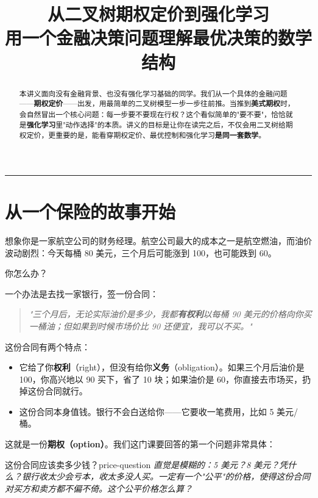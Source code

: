 \documentclass[11pt,a4paper]{ctexart}
\title{\bfseries 从二叉树期权定价到强化学习\\[4pt]
       \large 用一个金融决策问题理解最优决策的数学结构}
\author{}
\date{}
\newcommand{\1}{\mathbf{1}}
\begin{document}
\maketitle

\begin{abstract}
\noindent 本讲义面向没有金融背景、也没有强化学习基础的同学。我们从一个具体的金融问题——\textbf{期权定价}——出发，用最简单的二叉树模型一步一步往前推。当推到\textbf{美式期权}时，会自然冒出一个核心问题：每一步要不要现在行权？这个看似简单的"要不要"，恰恰就是\textbf{强化学习}里"动作选择"的本质。讲义的目标是让你在读完之后，不仅会用二叉树给期权定价，更重要的是，能看穿期权定价、最优控制和强化学习\textbf{是同一套数学}。
\end{abstract}

\tableofcontents
\vspace{1em}\hrule\vspace{1em}

\section{从一个保险的故事开始}

想象你是一家航空公司的财务经理。航空公司最大的成本之一是航空燃油，而油价波动剧烈：今天每桶 80 美元，三个月后可能涨到 100，也可能跌到 60。

你怎么办？

一个办法是去找一家银行，签一份合同：

\begin{quote}
\itshape "三个月后，无论实际油价是多少，我都\textbf{有权利}以每桶 90 美元的价格向你买一桶油；但如果到时候市场价比 90 还便宜，我可以不买。"
\end{quote}

这份合同有两个特点：

\begin{itemize}[leftmargin=*]
    \item 它给了你\textbf{权利}（right），但没有给你\textbf{义务}（obligation）。如果三个月后油价是 100，你高兴地以 90 买下，省了 10 块；如果油价是 60，你直接去市场买，扔掉这份合同就行。
    \item 这份合同本身值钱。银行不会白送给你——它要收一笔费用，比如 5 美元/桶。
\end{itemize}

这就是一份\textbf{期权（option）}。我们这门课要回答的第一个问题非常具体：

\begin{idea}{这份合同应该卖多少钱？}{price-question}
\itshape 直觉是模糊的：5 美元？8 美元？凭什么？银行收太少会亏本，收太多没人买。一定有一个"公平"的价格，使得这份合同对买方和卖方都不偏不倚。这个公平价格怎么算？
\end{idea}
\end{document}
